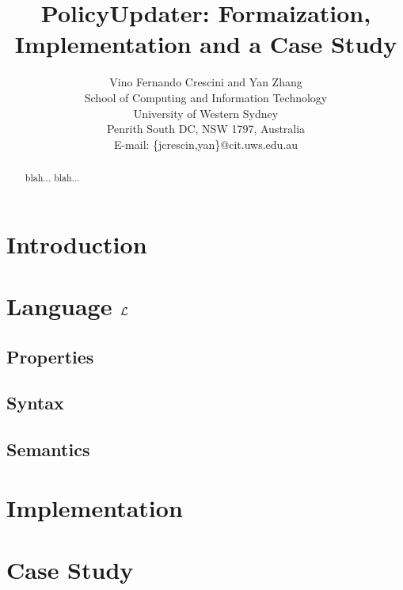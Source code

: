 \documentclass[10pt, twocolumn]{article}
\begin{document}
  \title{PolicyUpdater: Formaization, Implementation and a Case Study}
  \author{Vino Fernando Crescini and Yan Zhang \\
          School of Computing and Information Technology \\
          University of Western Sydney \\
          Penrith South DC, NSW 1797, Australia \\
          E-mail: \{jcrescin,yan\}@cit.uws.edu.au}

  \date{}

  \maketitle

  \begin{abstract}
    blah... blah...
  \end{abstract}

  \section{Introduction}

  \section{Language $\cal{L}$}

    \subsection{Properties}

    \subsection{Syntax}

    \subsection{Semantics}

  \section{Implementation} 

  \section{Case Study}
\end{document}
